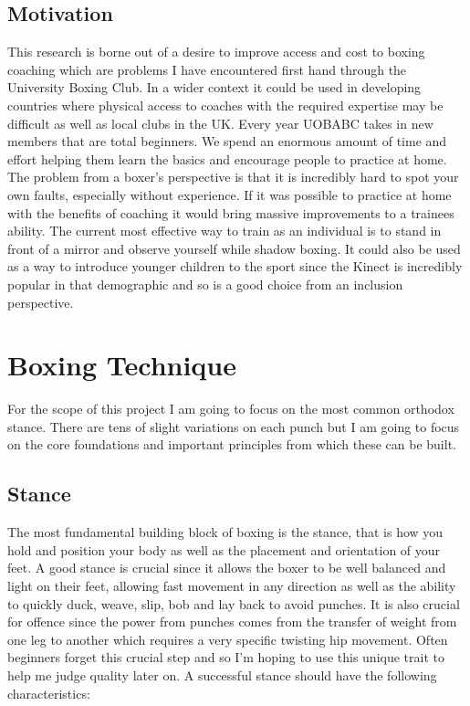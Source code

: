 \subsection{Motivation}
\label{subsec:subsec01}
This research is borne out of a desire to improve access and cost to boxing coaching which are problems I have encountered first hand through the University Boxing Club. In a wider context it could be used in developing countries where physical access to coaches with the required expertise may be difficult as well as local clubs in the UK.
Every year UOBABC takes in new members that are total beginners. We spend an enormous amount of time and effort helping them learn the basics and encourage people to practice at home. The problem from a boxer's perspective is that it is incredibly hard to spot your own faults, especially without experience.
If it was possible to practice at home with the benefits of coaching it would bring massive improvements to a trainees ability. The current most effective way to train as an individual is to stand in front of a mirror and observe yourself while shadow boxing.
It could also be used as a way to introduce younger children to the sport since the Kinect is incredibly popular in that demographic and so 
is a good choice from an inclusion perspective.
\section{Boxing Technique}
\label{sec:sec02}
For the scope of this project I am going to focus on the most common orthodox stance. There are tens of slight variations on each punch but I am going to focus on the core foundations and important principles from which these can be built.
\subsection{Stance}
\label{subsec:subsec02}
The most fundamental building block of boxing is the stance, that is how you hold and position your body as well as the placement and orientation of your feet. A good stance is crucial since it allows the boxer to be well balanced and light on their feet, allowing fast movement in any direction as well as the ability to quickly duck, weave, slip, bob and lay back to avoid punches. It is also crucial for offence since the power from punches comes from the transfer of weight from one leg to another which requires a very specific twisting hip movement. Often beginners forget this crucial step and so I'm hoping to use this unique trait to help me judge quality later on. A successful stance should have the following characteristics:

